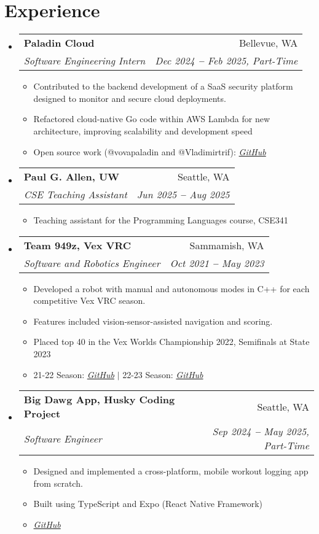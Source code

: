 \documentclass[letterpaper,11pt]{article}
\makeatletter
\newcommand{\resumeItem}[1]{
  \item\small{
    {#1 \vspace{-2pt}}
  }
}
\newcommand{\resumeSubheading}[4]{
  \vspace{-2pt}\item
    \begin{tabular*}{0.97\textwidth}[t]{l@{\extracolsep{\fill}}r}
      \textbf{#1} & #2 \\
      \textit{\small#3} & \textit{\small #4} \\
    \end{tabular*}\vspace{-7pt}
}
\newcommand{\resumeSubHeadingListStart}{\begin{itemize}[leftmargin=0.15in, label={}]}
\newcommand{\resumeSubHeadingListEnd}{\end{itemize}}
\newcommand{\resumeItemListStart}{\begin{itemize}}
\newcommand{\resumeItemListEnd}{\end{itemize}\vspace{-5pt}}
\makeatother
\begin{document}

\section{Experience}
  \vspace{3pt}
  \resumeSubHeadingListStart

  \resumeSubheading
    {Paladin Cloud}{Bellevue, WA}
    {Software Engineering Intern}{Dec 2024 \textbf{--} Feb 2025, Part-Time}
      \resumeItemListStart
          \resumeItem{Contributed to the backend development of a SaaS security platform designed to monitor and secure cloud deployments.}
          \resumeItem{Refactored cloud-native Go code within AWS Lambda for new architecture, improving scalability and development speed}
          \resumeItem{Open source work (@vovapaladin and @Vladimirtrif): \emph{\href{https://github.com/PaladinCloud/ce-extensions}{\color{blue}GitHub}} }
      \resumeItemListEnd

      \resumeSubheading
    {Paul G. Allen, UW}{Seattle, WA}
    {CSE Teaching Assistant}{Jun 2025 \textbf{--} Aug 2025}
      \resumeItemListStart
          \resumeItem{Teaching assistant for the Programming Languages course, CSE341}
      \resumeItemListEnd  

    \resumeSubheading
    {Team 949z, Vex VRC}{Sammamish, WA}
    {Software and Robotics Engineer}{Oct 2021 \textbf{--} May 2023}
      \resumeItemListStart
          \resumeItem{Developed a robot with manual and autonomous modes in C++ for each competitive Vex VRC season.}
          \resumeItem{Features included vision-sensor-assisted navigation and scoring.}
          \resumeItem{Placed top 40 in the Vex Worlds Championship 2022, Semifinals at State 2023}
          \resumeItem{21-22 Season: \emph{\href{https://github.com/Vladimirtrif/Team-949z_Pelmen_Vex_21-22}{\color{blue}GitHub}} 
          $|$  22-23 Season: \emph{\href{https://github.com/Vladimirtrif/Team-949z_Vex_22-23}{\color{blue}GitHub}} }
      \resumeItemListEnd

    \resumeSubheading
    {Big Dawg App, Husky Coding Project}{Seattle, WA}
    {Software Engineer}{Sep 2024 \textbf{--} May 2025, Part-Time}
      \resumeItemListStart
          \resumeItem{Designed and implemented a cross-platform, mobile workout logging app from scratch.}
          \resumeItem{Built using TypeScript and Expo (React Native Framework)}
          \resumeItem{\emph{\href{https://github.com/Vladimirtrif/big-dawg}{\color{blue}GitHub}} }
      \resumeItemListEnd
  \resumeSubHeadingListEnd
\end{document}
